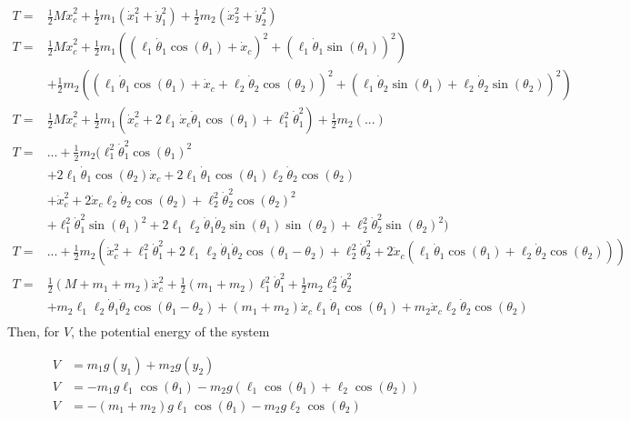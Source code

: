 \documentclass[10pt]{article}
\begin{document}
    \begin{equation}
        \begin{aligned} \label{eq:kinetic}
            T = &\frac{1}{2}  M  \dot x_c^2 + \frac{1}{2}  m_1(\dot x_1^2 + \dot y_1^2) + \frac{1}{2}m_2(\dot x_2^2 + \dot y_2^2) \\
            T = &\frac{1}{2}  M  \dot x_c^2 + \frac{1}{2}  m_1\left((\ell_1 \dot \theta_1 \cos(\theta_1) + \dot x_c)^2 + (\ell_1 \dot \theta_1 \sin(\theta_1))^2\right) \\
            &+ \frac{1}{2}  m_2\left((\ell_1 \dot \theta_1 \cos(\theta_1) + \dot x_c + \ell_2 \dot \theta_2\cos(\theta_2))^2 + (\ell_1 \dot \theta_2 \sin(\theta_1) + \ell_2\dot\theta_2\sin(\theta_2))^2\right)\\
            T = &\frac{1}{2} M\dot x_c^2 + \frac{1}{2}m_1(\dot x_c^2 + 2\ell_1\dot x_c \dot \theta_1 \cos(\theta_1) + \ell_1^2\dot\theta_1^2) + \frac{1}{2} m_2(...)\\
            T = &... + \frac{1}{2}m_2(\ell_1^2\dot\theta_1^2\cos(\theta_1)^2   \\
             &+ 2\ell_1\dot\theta_1\cos(\theta_2)\dot x_c + 2\ell_1\dot\theta_1\cos(\theta_1)\ell_2\dot\theta_2\cos(\theta_2)\\
             &+ \dot x_c^2 + 2\dot x_c \ell_2 \dot \theta_2 \cos(\theta_2) + \ell_2^2\dot\theta_2^2\cos(\theta_2)^2 \\
             &+\ell_1^2\dot\theta_1^2\sin(\theta_1)^2  +   2\ell_1\ell_2\dot\theta_1\dot\theta_2\sin(\theta_1)\sin(\theta_2) + \ell_2^2\dot\theta_2^2\sin(\theta_2)^2)\\
             T = &... + \frac{1}{2}m_2(\dot x_c^2 +\ell_1^2\dot\theta_1^2 + 2\ell_1\ell_2\dot\theta_1\dot\theta_2\cos(\theta_1 - \theta_2) + \ell_2^2\dot\theta_2^2     +      2\dot x_c(\ell_1\dot\theta_1\cos(\theta_1) + \ell_2\dot\theta_2\cos(\theta_2)))\\
             T = &\frac{1}{2}  (M + m_1 + m_2)  \dot x_c^2 + \frac{1}{2}(m_1 + m_2)\ell_1^2\dot\theta_1^2+ \frac{1}{2}m_2\ell_2^2\dot\theta_2^2\\
                 &+m_2\ell_1\ell_2\dot\theta_1\dot\theta_2\cos(\theta_1 - \theta_2)      +      (m_1 + m_2)\dot x_c\ell_1\dot\theta_1\cos(\theta_1) + m_2\dot x_c\ell_2\dot\theta_2\cos(\theta_2)\\
        \end{aligned}
    \end{equation}
    Then, for $V$, the potential energy of the system

    \begin{equation} \label{eq:potential}
        \begin{aligned}
        V &= m_1g(y_1) + m_2g(y_2)     \\
        V &= -m_1g\ell_1\cos(\theta_1) - m_2g(\ell_1\cos(\theta_1) +\ell_2\cos(\theta_2))\\
        V &= -(m_1+m_2)g\ell_1\cos(\theta_1) - m_2g\ell_2\cos(\theta_2)
        \end{aligned}
    \end{equation}
    
\end{document}
